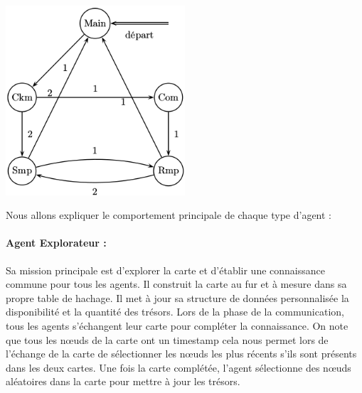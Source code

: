\documentclass[10pt]{article}
\begin{document}
\begin{center}
	\includegraphics[width=0.5\textwidth]{automate.png}
\end{center}

Nous allons expliquer le comportement principale de chaque type d'agent :
\paragraph{Agent Explorateur :}
Sa mission principale est d'explorer la carte et d'établir une connaissance commune pour tous les agents. Il construit la carte au fur et à mesure dans sa propre table de hachage. Il met à jour sa structure de données personnalisée la disponibilité et la quantité des trésors. Lors de la phase de la communication, tous les agents s'échangent leur carte pour compléter la connaissance. On note que tous les nœuds de la carte ont un timestamp cela nous permet lors de l'échange de la carte de sélectionner les nœuds les plus récents s'ils sont présents dans les deux cartes. Une fois la carte complétée, l'agent sélectionne des nœuds aléatoires dans la carte pour mettre à jour les trésors.
\end{document}
